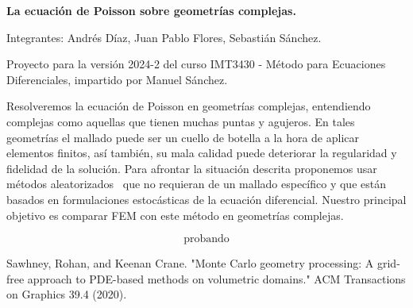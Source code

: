 \documentclass{article}
\begin{document}
\begin{center}
{\bfseries\Large
  La ecuación de Poisson sobre geometrías complejas.
}

\vspace{0.25cm}

Integrantes: Andrés Díaz, Juan Pablo Flores, Sebastián Sánchez.

\vspace{0.5cm}

{\scriptsize
Proyecto para la versión 2024-2 del curso 
IMT3430 - Método para Ecuaciones Diferenciales, impartido por Manuel Sánchez.
}
\end{center}

Resolveremos la ecuación de Poisson en geometrías complejas, entendiendo
complejas como aquellas que tienen muchas puntas y agujeros.
En tales geometrías el mallado puede ser un cuello de botella a la hora
de aplicar elementos finitos, así también, su mala calidad puede
deteriorar la regularidad y fidelidad de la solución.
Para afrontar la situación descrita proponemos usar métodos 
aleatorizados~\cite{sawhney2020}
que no requieran de un mallado específico y que están basados en
formulaciones estocásticas de la ecuación diferencial.
Nuestro principal objetivo es comparar FEM con este método 
en geometrías complejas.

$$\text{probando}$$

\begin{thebibliography}{9}
Sawhney, Rohan, and Keenan Crane. "Monte Carlo geometry processing: A grid-free approach to PDE-based methods on volumetric domains." ACM Transactions on Graphics 39.4 (2020).
\end{thebibliography}
\end{document}
